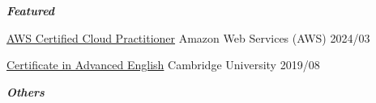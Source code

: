 \clearpage
{}

\textbf{\textit{Featured}}

\begin{cvcerts}

	\cvcert
	{\href{https://www.credly.com/badges/f19ebd37-79be-4d9e-807b-bb4a19b63187/public_url}{AWS Certified Cloud Practitioner}} %
	{Amazon Web Services (AWS)} %
	{} %
	{2024/03} %
		
	\cvcert
	{\href{https://1drv.ms/b/s!AkPthURenJLHi8Vx6tme1nLdTLFksw?e=fgHyIm}{Certificate in Advanced English}} %
	{Cambridge University} %
	{} %
	{2019/08} %


\end{cvcerts}

\vspace*{2mm}

\textbf{\textit{Others}}


